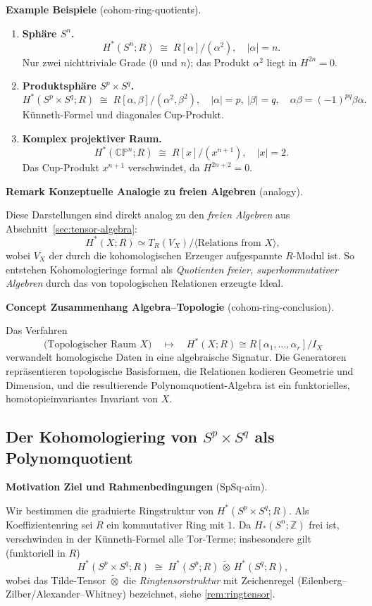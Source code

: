 \documentclass[10pt, letterpaper]{article}
\newcommand{\CustomHeading}[3]{%
  \par\medskip\noindent%
  \textbf{#1 #2} \textnormal{(#3)}.\enskip%
}
\newenvironment{REM}[2]{\begin{unitbox}\CustomHeading{Remark}{#1}{#2}}{\end{unitbox}}
\newenvironment{EXA}[2]{\begin{unitbox}\CustomHeading{Example}{#1}{#2}}{\end{unitbox}}
\newenvironment{CONC}[2]{\begin{unitbox}\CustomHeading{Concept}{#1}{#2}}{\end{unitbox}}
\newenvironment{MOT}[2]{\begin{unitbox}\CustomHeading{Motivation}{#1}{#2}}{\end{unitbox}}
\begin{document}
\begin{EXA}{Beispiele}{cohom-ring-quotients}
\begin{enumerate}[label=(\alph*), leftmargin=*]
\item \textbf{Sphäre $S^n$.}
\[
H^\ast(S^n;R)\;\cong\;R[\alpha]/(\alpha^2),
\quad |\alpha|=n.
\]
Nur zwei nichttriviale Grade ($0$ und $n$);
das Produkt $\alpha^2$ liegt in $H^{2n}=0$.

\item \textbf{Produktsphäre $S^p\times S^q$.}
\[
H^\ast(S^p\times S^q;R)
\;\cong\;
R[\alpha,\beta]/(\alpha^2,\beta^2),
\quad |\alpha|=p,\ |\beta|=q,
\quad \alpha\beta=(-1)^{pq}\beta\alpha.
\]
Künneth-Formel und diagonales Cup-Produkt.

\item \textbf{Komplex projektiver Raum.}
\[
H^\ast(\mathbb{CP}^n;R)
\;\cong\;
R[x]/(x^{n+1}),
\quad |x|=2.
\]
Das Cup-Produkt $x^{n+1}$ verschwindet, da $H^{2n+2}=0$.
\end{enumerate}
\end{EXA}

\begin{REM}{Konzeptuelle Analogie zu freien Algebren}{analogy}
Diese Darstellungen sind direkt analog zu den
\emph{freien Algebren} aus Abschnitt~\ref{sec:tensor-algebra}:
\[
H^\ast(X;R)
\simeq
T_R(V_X)\big/ \langle \text{Relations from }X\rangle,
\]
wobei $V_X$ der durch die kohomologischen Erzeuger
aufgespannte $R$-Modul ist.
So entstehen Kohomologieringe formal
als \emph{Quotienten freier, superkommutativer Algebren}
durch das von topologischen Relationen erzeugte Ideal.
\end{REM}

\begin{CONC}{Zusammenhang Algebra–Topologie}{cohom-ring-conclusion}
Das Verfahren
\[
\text{(Topologischer Raum $X$)}\quad\longmapsto\quad
H^\ast(X;R)\cong R[\alpha_1,\dots,\alpha_r]/I_X
\]
verwandelt homologische Daten in eine algebraische Signatur.
Die Generatoren repräsentieren topologische Basisformen,
die Relationen kodieren Geometrie und Dimension,
und die resultierende Polynomquotient-Algebra
ist ein funktorielles, homotopieinvariantes Invariant von $X$.
\end{CONC}

\subsection{Der Kohomologiering von $S^p\times S^q$ als Polynomquotient}

\begin{MOT}{Ziel und Rahmenbedingungen}{SpSq-aim}
Wir bestimmen die graduierte Ringstruktur von $H^\ast(S^p\times S^q;R)$. 
Als Koeffizientenring sei $R$ ein kommutativer Ring mit $1$. 
Da $H_\ast(S^n;\mathbb{Z})$ frei ist, verschwinden in der Künneth-Formel alle $\mathrm{Tor}$-Terme; 
insbesondere gilt (funktoriell in $R$)
\[
H^\ast(S^p\times S^q;R)\;\cong\;H^\ast(S^p;R)\,\widetilde{\otimes}\,H^\ast(S^q;R),
\]
wobei das Tilde-Tensor \(\widetilde{\otimes}\) die \emph{Ring\-tensor\-struktur} mit Zeichenregel (Eilenberg–Zilber/Alexander–Whitney) bezeichnet, siehe \ref{rem:ringtensor}.
\end{MOT}
\end{document}
